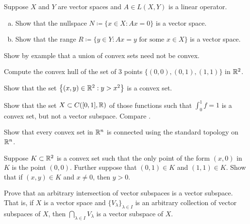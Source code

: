 \begin{samepage}
\begin{exercise}[Easy]
Suppose $X$ and $Y$ are vector spaces and $A \in L(X,Y)$ is a linear
operator.
\begin{enumerate}[a)]
\item
Show that the nullspace $N \coloneqq \{ x \in X : Ax = 0 \}$ is a
vector space.
\item
Show that the range $R \coloneqq \{ y \in Y : Ax = y \text{ for some } x \in X \}$ is a
vector space.
\end{enumerate}
\end{exercise}
\end{samepage}

\begin{exercise}[Easy]
Show by example that a union of convex sets need not be convex.
\end{exercise}

\begin{exercise}
Compute the convex hull of the set of 3 points
$\bigl\{ (0,0), (0,1), (1,1) \bigr\}$
in ${\mathbb{R}}^2$.
\end{exercise}

\begin{exercise}
Show that the set $\bigl\{ (x,y) \in {\mathbb{R}}^2 : y > x^2 \bigr\}$ is a convex set.
\end{exercise}

\begin{exercise} \label{exercise:intoneconvex}
Show that the set $X \subset C([0,1],{\mathbb{R}})$ of those functions such 
that $\int_0^1 f = 1$ is a convex set, but not a vector subspace.
Compare .
\end{exercise}


\begin{exercise}
Show that every convex set in ${\mathbb{R}}^n$ is connected using the standard
topology on ${\mathbb{R}}^n$.
\end{exercise}

\begin{exercise}
Suppose $K \subset {\mathbb{R}}^2$ is a convex set such that the only point of
the form $(x,0)$ in $K$ is the point $(0,0)$.  Further suppose that
$(0,1) \in K$ and $(1,1) \in K$.  Show that if $(x,y) \in K$ and $x
\not= 0$, then $y > 0$.
\end{exercise}

\begin{exercise}
Prove that an arbitrary intersection of vector subspaces
is a vector subspace.
That is, if $X$ is a vector space and
$\{ V_\lambda \}_{\lambda \in I}$ is
an arbitrary collection of vector subspaces of $X$,
then
$\bigcap_{\lambda \in I} V_\lambda$ is a vector subspace of $X$.
\end{exercise}

